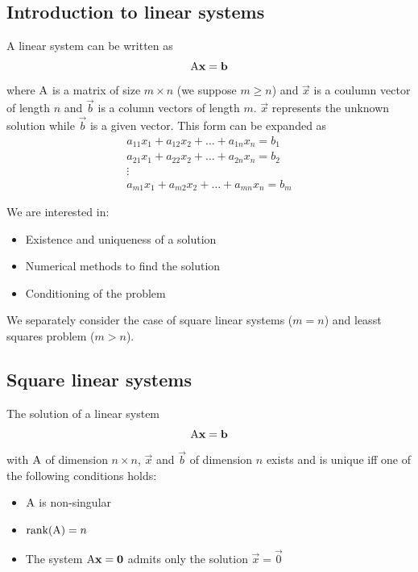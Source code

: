 \subsection{Introduction to linear systems}

A linear system can be written as
$$ \mathrm{A}\mathbf{x} = \mathbf{b} $$
where $\mathrm{A}$ is a  matrix of size $m \times n$ (we suppose $m \geq n$) and $\vec{x}$ is a coulumn  vector of length $n$  and $\vec{b}$ is  a column vectors of length $m$. $\vec{x}$ represents the unknown solution while $\vec{b}$ is a given vector. This form can be expanded as
$$
    \begin{matrix}
        a_{11}x_1 + a_{12}x_2 + \hdots + a_{1n}x_n = b_1\\
        a_{21}x_1 + a_{22}x_2 + \hdots + a_{2n}x_n = b_2\\
        \vdots\\
        a_{m1}x_1 + a_{m2}x_2 + \hdots + a_{mn}x_n = b_m
    \end{matrix}
$$

We are interested in:

\begin{itemize}
    \item Existence and uniqueness of a solution
    \item Numerical methods to find the solution
    \item Conditioning of the problem
\end{itemize}

We separately consider the case of square linear systems ($m=n$) and leasst squares problem ($m>n$).

\subsection{Square linear systems}


\begin{proposition}
    The solution of a linear system
    $$ \mathrm{A}\mathbf{x} = \mathbf{b} $$
    with $\mathrm{A}$ of dimension $n \times n$, $\vec{x}$ and $\vec{b}$ of dimension $n$ exists and is unique iff one of the following conditions holds:
    
    \begin{itemize}
        \item $\mathrm{A}$ is non-singular
        \item $\mathrm{rank}(\mathrm{A}) = n$
           \item  The system $\mathrm{A}\mathbf{x} = \mathbf{0}$ admits only the solution $\vec{x} = \vec{0}$
    \end{itemize}

\end{proposition}

